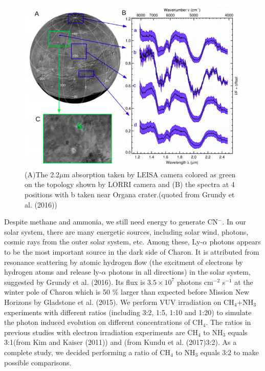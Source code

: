 \begin{figure}
\centering
\includegraphics[width=\textwidth]{figures/chapter1/IR.png}
\caption{(A)The 2.2$\mu$m absorption taken by LEISA camera colored as green on the topology shown by LORRI camera and (B) the spectra at 4 positions with b taken near Organa crater.(quoted from Grundy et al. (2016)\cite{grundy2016surface})}
\label{fig:Charon_IR}
\end{figure}

Despite methane and ammonia, we still need energy to generate CN$^-$. In our solar system, there are many energetic sources, including solar wind, photons, cosmic rays from the outer solar system, etc. Among these, Ly-$\alpha$ photons appears to be the most important source in the dark side of Charon. It is attributed from resonance scattering by atomic hydrogen flow (the excitment of electrons by hydrogen atoms and release ly-$\alpha$ photons in all directions) in the solar system, suggested by Grundy et al. (2016)\cite{grundy2016formation}. Its flux is $3.5 \times 10^7$ photons cm$^{-2}$ s$^{-1}$ at the winter pole of Charon which is 50 \% larger than expected before Mission New Horizons by Gladstone et al. (2015)\cite{gladstone2015lyalpha}. We perform VUV irradiation on CH$_4$+NH$_3$ experiments with different ratios (including 3:2, 1:5, 1:10 and 1:20) to simulate the photon induced evolution on different concentrations of CH$_4$. The ratios in previous studies with electron irradiation experiments are CH$_4$ to NH$_3$ equals 3:1(from Kim and Kaiser (2011)\cite{kim}) and (from Kundu et al. (2017)3:2\cite{kundu2017electron}). As a complete study, we decided performing a ratio of CH$_4$ to NH$_3$ equals 3:2 to make possible comparisons.

